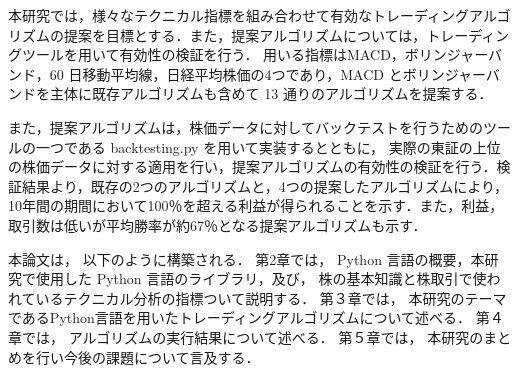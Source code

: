 本研究では，様々なテクニカル指標を組み合わせて有効なトレーディングアルゴリズムの提案を目標とする．また，提案アルゴリズムについては，トレーディングツールを用いて有効性の検証を行う．
用いる指標はMACD，ボリンジャーバンド，60 日移動平均線，日経平均株価の4つであり，MACD とボリンジャーバンドを主体に既存アルゴリズムも含めて 13 通りのアルゴリズムを提案する．

また，提案アルゴリズムは，株価データに対してバックテストを行うためのツールの一つである backtesting.py を用いて実装するとともに，
実際の東証の上位の株価データに対する適用を行い，提案アルゴリズムの有効性の検証を行う．検証結果より，既存の2つのアルゴリズムと，4つの提案したアルゴリズムにより，10年間の期間において100％を超える利益が得られることを示す．また，利益，取引数は低いが平均勝率が約67％となる提案アルゴリズムも示す．

本論文は， 以下のように構築される． 第2章では， Python 言語の概要，本研究で使用した Python 言語のライブラリ，及び， 
株の基本知識と株取引で使われているテクニカル分析の指標ついて説明する．
第３章では， 本研究のテーマであるPython言語を用いたトレーディングアルゴリズムについて述べる． 第４章では， アルゴリズムの実行結果について述べる． 第５章では， 本研究のまとめを行い今後の課題について言及する．

